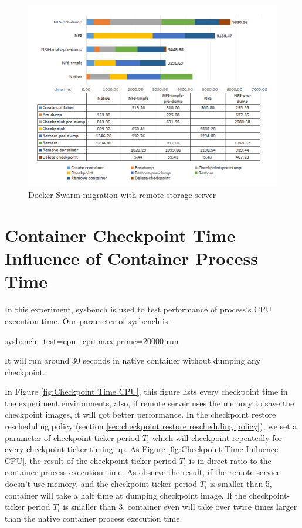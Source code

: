 \begin{figure}[hbtp]
\includegraphics[width=17cm]{figure/migration_time.png}
\caption{Docker Swarm migration with remote storage server}
\label{fig:Docker Swarm migration time with remote storage server}
\end{figure}

\section{Container Checkpoint Time Influence of Container Process Time}
In this experiment, sysbench\cite{kopytov2004sysbench} is used to test performance of process's CPU execution time. Our parameter of sysbench is:
\begin{center}
sysbench --test=cpu --cpu-max-prime=20000 run
\end{center}
It will run around 30 seconds in native container without dumping any checkpoint.

In Figure \ref{fig:Checkpoint Time CPU}, this figure lists every checkpoint time in the experiment environments, also, if remote server uses the memory to save the checkpoint images, it will got better performance.
In the checkpoint restore rescheduling policy (section \ref{sec:checkpoint restore rescheduling policy}), we set a parameter of checkpoint-ticker period $ T_i $ which will checkpoint repeatedly for every checkpoint-ticker timing up.
As Figure \ref{fig:Checkpoint Time Influence CPU}, the result of the checkpoint-ticker period $ T_i $ is in direct ratio to the container process execution time.
As observe the result, if the remote service doesn't use memory, and the checkpoint-ticker period $ T_i $ is smaller than 5, container will take a half time at dumping checkpoint image. If the checkpoint-ticker period $ T_i $ is smaller than 3, container even will take over twice times larger than the native container process execution time.

